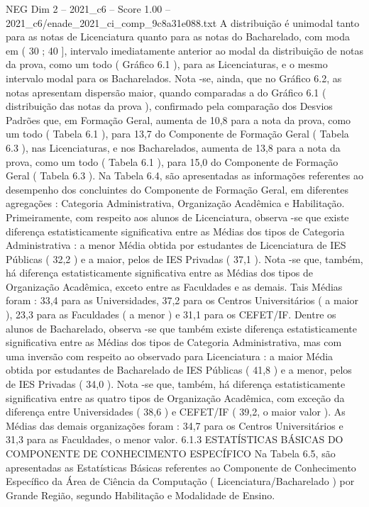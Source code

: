 \begin{textsample}{NEG Dim 2 – 2021\_c6 – Score 1.00 – 2021\_c6/enade\_2021\_ci\_comp\_9c8a31e088.txt}
A distribuição é unimodal tanto para as notas de Licenciatura quanto para as notas do Bacharelado, com moda em ( 30 ; 40 ], intervalo imediatamente anterior ao modal da distribuição de notas da prova, como um todo ( Gráfico 6.1 ), para as Licenciaturas, e o mesmo intervalo modal para os Bacharelados.
Nota -se, ainda, que no Gráfico 6.2, as notas apresentam dispersão maior, quando comparadas a do Gráfico 6.1 ( distribuição das notas da prova ), confirmado pela comparação dos Desvios Padrões que, em Formação Geral, aumenta de 10,8 para a nota da prova, como um todo ( Tabela 6.1 ), para 13,7 do Componente de Formação Geral ( Tabela 6.3 ), nas Licenciaturas, e nos Bacharelados, aumenta de 13,8 para a nota da prova, como um todo ( Tabela 6.1 ), para 15,0 do Componente de Formação Geral ( Tabela 6.3 ).
Na Tabela 6.4, são apresentadas as informações referentes ao desempenho dos concluintes do Componente de Formação Geral, em diferentes agregações : Categoria Administrativa, Organização Acadêmica e Habilitação.
Primeiramente, com respeito aos alunos de Licenciatura, observa -se que existe diferença estatisticamente significativa entre as Médias dos tipos de Categoria Administrativa : a menor Média obtida por estudantes de Licenciatura de IES Públicas ( 32,2 ) e a maior, pelos de IES Privadas ( 37,1 ).
Nota -se que, também, há diferença estatisticamente significativa entre as Médias dos tipos de Organização Acadêmica, exceto entre as Faculdades e as demais.
Tais Médias foram : 33,4 para as Universidades, 37,2 para os Centros Universitários ( a maior ), 23,3 para as Faculdades ( a menor ) e 31,1 para os CEFET/IF.
Dentre os alunos de Bacharelado, observa -se que também existe diferença estatisticamente significativa entre as Médias dos tipos de Categoria Administrativa, mas com uma inversão com respeito ao observado para Licenciatura : a maior Média obtida por estudantes de Bacharelado de IES Públicas ( 41,8 ) e a menor, pelos de IES Privadas ( 34,0 ).
Nota -se que, também, há diferença estatisticamente significativa entre as quatro tipos de Organização Acadêmica, com exceção da diferença entre Universidades ( 38,6 ) e CEFET/IF ( 39,2, o maior valor ).
As Médias das demais organizações foram : 34,7 para os Centros Universitários e 31,3 para as Faculdades, o menor valor. 6.1.3 ESTATÍSTICAS BÁSICAS DO COMPONENTE DE CONHECIMENTO ESPECÍFICO Na Tabela 6.5, são apresentadas as Estatísticas Básicas referentes ao Componente de Conhecimento Específico da Área de Ciência da Computação ( Licenciatura/Bacharelado ) por Grande Região, segundo Habilitação e Modalidade de Ensino.

\end{textsample}
